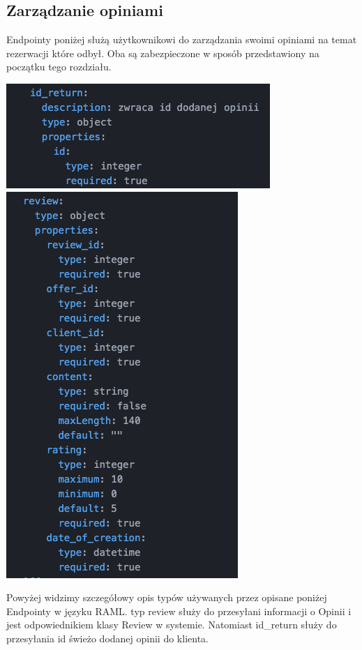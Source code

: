 \documentclass{article}
\begin{document}
\subsection{Zarządzanie opiniami}
Endpointy poniżej służą użytkownikowi do zarządzania swoimi opiniami na temat rezerwacji które odbył.
Oba są zabezpieczone w sposób przedstawiony na początku tego rozdziału.\newline
\begin{center}
    \includegraphics[scale=0.7]{Review+id/return_id.png}
    \includegraphics[scale=0.7]{Review+id/review.png}
\end{center}
Powyżej widzimy szczegółowy opis typów używanych przez opisane poniżej Endpointy w języku RAML. typ review służy do przesyłani informacji o Opinii i jest odpowiednikiem klasy Review w systemie. Natomiast id\_return służy do przesyłania id świeżo dodanej opinii do klienta.
\end{document}
